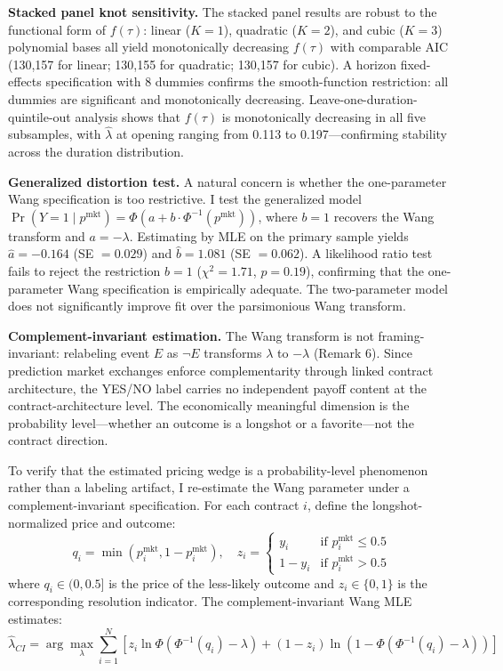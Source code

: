 \documentclass[12pt,a4paper]{article}
\begin{document}
\textbf{Stacked panel knot sensitivity.} The stacked panel results are
robust to the functional form of \(f(\tau)\): linear (\(K=1\)),
quadratic (\(K=2\)), and cubic (\(K=3\)) polynomial bases all yield
monotonically decreasing \(f(\tau)\) with comparable AIC (130,157 for
linear; 130,155 for quadratic; 130,157 for cubic). A horizon
fixed-effects specification with 8 dummies confirms the smooth-function
restriction: all dummies are significant and monotonically decreasing.
Leave-one-duration-quintile-out analysis shows that \(f(\tau)\) is
monotonically decreasing in all five subsamples, with \(\hat{\lambda}\)
at opening ranging from 0.113 to 0.197---confirming stability across the
duration distribution.

\textbf{Generalized distortion test.} A natural concern is whether the
one-parameter Wang specification is too restrictive. I test the
generalized model
\(\Pr(Y = 1 \mid p^{\text{mkt}}) = \Phi(a + b \cdot \Phi^{-1}(p^{\text{mkt}}))\),
where \(b = 1\) recovers the Wang transform and \(a = -\lambda\).
Estimating by MLE on the primary sample yields \(\hat{a} = -0.164\) (SE
\(= 0.029\)) and \(\hat{b} = 1.081\) (SE \(= 0.062\)). A likelihood
ratio test fails to reject the restriction \(b = 1\) (\(\chi^2 = 1.71\),
\(p = 0.19\)), confirming that the one-parameter Wang specification is
empirically adequate. The two-parameter model does not significantly
improve fit over the parsimonious Wang transform.

\textbf{Complement-invariant estimation.} The Wang transform is not
framing-invariant: relabeling event \(E\) as \(\neg E\) transforms
\(\lambda\) to \(-\lambda\) (Remark 6). Since prediction market
exchanges enforce complementarity through linked contract architecture,
the YES/NO label carries no independent payoff content at the
contract-architecture level. The economically meaningful dimension is
the probability level---whether an outcome is a longshot or a
favorite---not the contract direction.

To verify that the estimated pricing wedge is a probability-level
phenomenon rather than a labeling artifact, I re-estimate the Wang
parameter under a complement-invariant specification. For each contract
\(i\), define the longshot-normalized price and outcome:
\[q_i = \min(p_i^{\text{mkt}}, 1 - p_i^{\text{mkt}}), \quad z_i = \begin{cases} y_i & \text{if } p_i^{\text{mkt}} \leq 0.5 \\ 1 - y_i & \text{if } p_i^{\text{mkt}} > 0.5 \end{cases}\]
where \(q_i \in (0, 0.5]\) is the price of the less-likely outcome and
\(z_i \in \{0,1\}\) is the corresponding resolution indicator. The
complement-invariant Wang MLE estimates:
\[\hat{\lambda}_{CI} = \arg\max_\lambda \sum_{i=1}^N \left[z_i \ln \Phi(\Phi^{-1}(q_i) - \lambda) + (1-z_i) \ln(1 - \Phi(\Phi^{-1}(q_i) - \lambda))\right]\]
\end{document}

